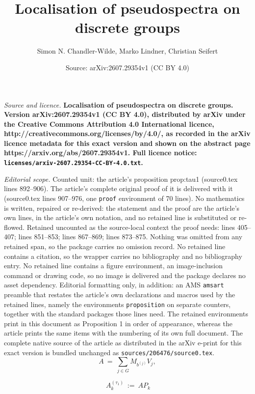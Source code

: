 \documentclass[10pt,a4paper]{amsart}
\title{\bf Localisation of pseudospectra on discrete groups}
\author{Simon N. Chandler-Wilde, Marko Lindner, Christian Seifert}
\date{Source: arXiv:2607.29354v1 (CC BY 4.0)}
\begin{document}
\maketitle

\noindent\emph{Source and licence.} \bf Localisation of pseudospectra on discrete groups. Version arXiv:2607.29354v1 (CC BY 4.0), distributed by arXiv under the Creative Commons Attribution 4.0 International licence, http://creativecommons.org/licenses/by/4.0/, as recorded in the arXiv licence metadata for this exact version and shown on the abstract page https://arxiv.org/abs/2607.29354v1. Full licence notice: \texttt{licenses/arxiv-2607.29354-CC-BY-4.0.txt}.\par\smallskip

\noindent\textit{Editorial scope.} Counted unit: the article's proposition prop:tau1 (source0.tex lines 892--906). The article's complete original proof of it is delivered with it (source0.tex lines 907--976, one \texttt{proof} environment of 70 lines). No mathematics is written, repaired or re-derived: the statement and the proof are the article's own lines, in the article's own notation, and no retained line is substituted or re-flowed.  Retained uncounted as the source-local context the proof needs: lines 405--407; lines 851--853; lines 867--869; lines 873--875.  Nothing was omitted from any retained span, so the package carries no omission record.  No retained line contains a citation, so the wrapper carries no bibliography and no bibliography entry.  No retained line contains a figure environment, an image-inclusion command or drawing code, so no image is delivered and the package declares no asset dependency.  Editorial formatting only, in addition: an AMS \texttt{amsart} preamble that restates the article's own declarations and macros used by the retained lines, namely the environments \texttt{proposition} on separate counters, together with the standard packages those lines need.  The retained environments print in this document as Proposition 1 in order of appearance, whereas the article prints the same items with the numbering of its own full document.  The complete native source of the article as distributed in the arXiv e-print for this exact version is bundled unchanged as \texttt{sources/206476/source0.tex}.
\begin{equation} \label{eq:AW}
A\ =\ \sum_{j\in G}M_{b^{(j)}}V_j,
\end{equation}

\begin{equation} \label{eq:patchA_tau1}
\ A_k^{(\tau_1)}\ :=\ AP_k
\end{equation}
\end{document}
